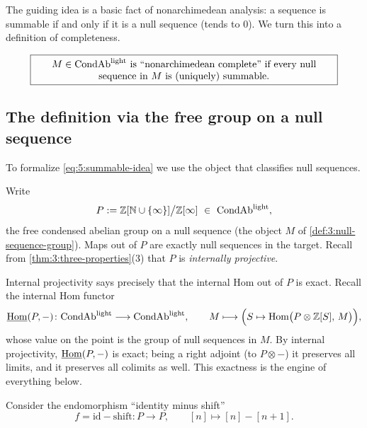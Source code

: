 The guiding idea is a basic fact of nonarchimedean analysis: a sequence is
summable if and only if it is a null sequence (tends to $0$). We turn this into a
definition of completeness.

\begin{equation}
\label{eq:5:summable-idea}
\boxed{\begin{minipage}{0.88\linewidth}\centering
$M\in\CondAbl$ is ``nonarchimedean complete'' if every null sequence in $M$
is (uniquely) summable.
\end{minipage}}
\end{equation}

\subsection{The definition via the free group on a null sequence}

To formalize \eqref{eq:5:summable-idea} we use the object that classifies null
sequences.

\begin{notation}
\label{not:5:P}
Write
\begin{equation*}
P:=\mathbb{Z}[\mathbb{N}\cup\{\infty\}]\big/\mathbb{Z}[\infty]\ \in\ \CondAbl,
\end{equation*}
the free condensed abelian group on a null sequence (the object $M$ of
\cref{def:3:null-sequence-group}). Maps out of $P$ are exactly null sequences in
the target. Recall from \cref{thm:3:three-properties}(3) that $P$ is
\emph{internally projective}.
\end{notation}

Internal projectivity says precisely that the internal Hom out of $P$ is exact.
Recall the internal Hom functor
\begin{equation*}
\underline{\operatorname{Hom}}(P,-)\colon\mathrm{CondAb}^{\mathrm{light}}\longrightarrow\mathrm{CondAb}^{\mathrm{light}},\qquad
M\longmapsto\Bigl(S\mapsto\operatorname{Hom}\bigl(P\otimes\mathbb{Z}[S],\,M\bigr)\Bigr),
\end{equation*}
whose value on the point is the group of null sequences in $M$. By internal
projectivity, $\underline{\operatorname{Hom}}(P,-)$ is exact; being a right adjoint (to $P\otimes-$) it
preserves all limits, and it preserves all colimits as well. This exactness is
the engine of everything below.

Consider the endomorphism ``identity minus shift''
\begin{equation}
\label{eq:5:shift}
f=\mathrm{id}-\mathrm{shift}\colon P\longrightarrow P,\qquad
[n]\longmapsto[n]-[n+1].
\end{equation}

